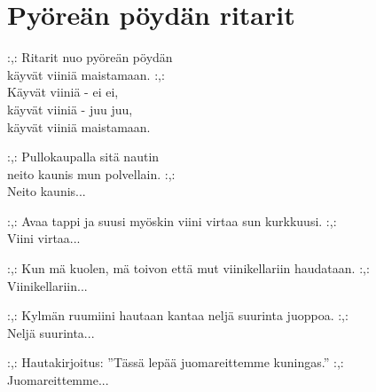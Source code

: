 \section{Pyöreän pöydän ritarit}
\vspace{-0.3cm}
:,: Ritarit nuo pyöreän pöydän \\
käyvät viiniä maistamaan. :,: \\
Käyvät viiniä - ei ei, \\
käyvät viiniä - juu juu, \\
käyvät viiniä maistamaan.

:,: Pullokaupalla sitä nautin \\
neito kaunis mun polvellain. :,: \\
Neito kaunis...

:,: Avaa tappi ja suusi myöskin viini virtaa sun kurkkuusi. :,: \\
Viini virtaa...

:,: Kun mä kuolen, mä toivon että mut viinikellariin haudataan. :,: \\
Viinikellariin...

:,: Kylmän ruumiini hautaan kantaa neljä suurinta juoppoa. :,:\\
Neljä suurinta...

:,: Hautakirjoitus: ''Tässä lepää juomareittemme kuningas.'' :,: \\
Juomareittemme...